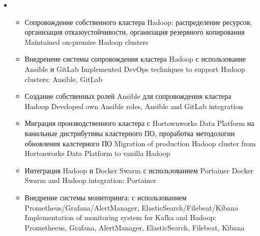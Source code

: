 \documentclass[11pt,a4paper,sans, russian]{moderncv}        %
\begin{document}
{\begin{itemize}
\begin{itemize}
				{Участие в проектах для MS SQL Server}
				{Participated in projects for MS SQL Server}
      		\item {}
      			{Внедрение и сопровождение СУБД PostgreSQL в кластерном режиме, интеграция с Hadoop с использованием KafkaConnect и Debezium}
      			{Integrated PostgreSQL cluster: Patroni}
		\end{itemize}
		\item {}
		\begin{itemize}
			\item {}
				{Сопровождение собственного кластера Hadoop: распределение ресурсов, организация отказоустойчивости, организация резервного копирования}
				{Maintained on-premise Hadoop clusters}
			\item {}
				{Внедренеие системы сопровождения кластера Hadoop с использование Ansible и GitLab}
				{Implemented DevOps techniques to support Hadoop clusters: Ansible, GitLab}
			\item {}
				{Создание собственных ролей Ansible для сопровождения кластера Hadoop}
				{Developed own Ansible roles, Ansible and GitLab integration}
			\item {}
				{Миграция производственного кластера с Hortownworks Data Platform на ванильные дистрибутивы кластерного ПО, проработка методологии обновления калстерного ПО}
				{Migration of production Hadoop cluster from Hortonworks Data Platform to vanilla Hadoop}
			\item {}
				{Интеграция Hadoop и Docker Swarm с использованием Portainer}
				{Docker Swarm and Hadoop integration: Portainer}
			\item {}
				{Внедрение системы мониторинга: с использованием Prometheus/Grafana/AlertManager, ElasticSearch/Filebeat/Kibana}
				{Implementation of monitoring system for Kafka and Hadoop: Prometheeus, Grafana, AlertManager, ElasticSearch, Filebeat, Kibana}
		\end{itemize}
	\end{itemize}
}
\end{document}
